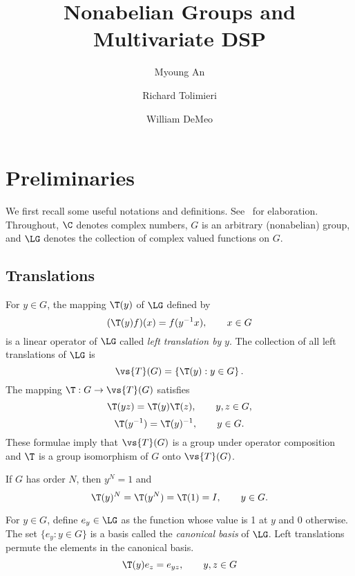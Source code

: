 


\title{Nonabelian Groups and Multivariate DSP}
\author{Myoung An\and Richard Tolimieri \and William DeMeo}
\maketitle


\section{Preliminaries}
We first recall some useful notations and definitions.
See~\cite{An:2003} for elaboration.  Throughout, $\C$ denotes complex
numbers, $G$ is an arbitrary (nonabelian) group, %
and $\LG$ denotes the collection of complex valued functions on $G$.

\subsection{Translations}
For $y\in G$, the mapping $\T(y)$ of $\LG$ defined by 
\[
(\T(y)f)(x) = f(y^{-1}x), \qquad x \in G
\]
is a linear operator of $\LG$ called \emph{left translation by} $y$.  The
collection of all left translations of $\LG$ is
\[
\vs{T}(G) = \left\{\T(y) : y \in G \right\}.
\]
The mapping $\T:G \to \vs{T}(G)$ satisfies
\[
\T(yz) = \T(y)\T(z), \qquad y, z \in G,
\]
\[
\T(y^{-1}) = \T(y)^{-1}, \qquad y \in G.
\]
These formulae imply that $\vs{T}(G)$ is a group under operator composition and $\T$
is a group isomorphism of $G$ onto $\vs{T}(G)$.

If $G$ has order $N$, then $y^N = 1$ and 
\[
\T(y)^N = \T(y^N) = \T(1) = I, \qquad y \in G.
\]

For $y\in G$, define $e_y\in \LG$ as the function whose value is 1 at $y$ and
0 otherwise.  The set $\{e_y : y\in G\}$ is a basis called the \emph{canonical
  basis} of $\LG$.  Left translations permute the elements in the canonical
basis.
\[
\T(y)e_z = e_{yz}, \qquad y, z \in G
\]

